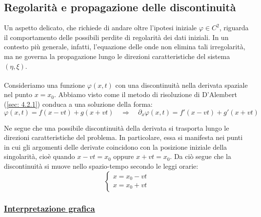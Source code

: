 \documentclass[a4paper,12pt]{report}
\begin{document}
\newpage

\subsection{Regolarità e propagazione delle discontinuità}

Un aspetto delicato, che richiede di andare oltre l’ipotesi iniziale $\varphi\in C^2$, riguarda il comportamento delle possibili perdite di regolarità dei dati iniziali. In un contesto più generale, infatti, l’equazione delle onde non elimina tali irregolarità, ma ne governa la propagazione lungo le direzioni caratteristiche del sistema $(\eta,\xi)$.
\\
\\Consideriamo una funzione $\varphi(x,t)$ con una discontinuità nella derivata spaziale nel punto $x=x_0$. Abbiamo visto come il metodo di risoluzione di D'Alembert (\ref{sec: 4.2.1}) conduca a una soluzione della forma:
\[
\varphi(x,t)=f(x-vt)+g(x+vt)
\quad \Longrightarrow \quad
\partial_x \varphi(x,t)=f'(x-vt)+g'(x+vt)
\]

Ne segue che una possibile discontinuità della derivata si trasporta lungo le direzioni caratteristiche del problema. In particolare, essa si manifesta nei punti in cui gli argomenti delle derivate coincidono con la posizione iniziale della singolarità, cioè quando $x-vt=x_0$ oppure $x+vt=x_0$. Da ciò segue che la discontinuità si muove nello spazio-tempo secondo le leggi orarie:
\[
\begin{cases}
    x=x_0-vt \\
    x=x_0+vt
\end{cases}
\]

\subsubsection{\underline{Interpretazione grafica}}
\end{document}
